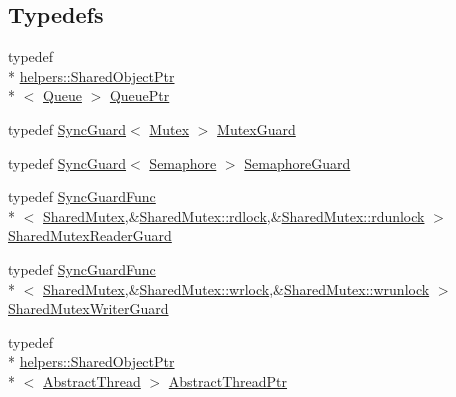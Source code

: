 \subsection*{Typedefs}
\begin{DoxyCompactItemize}
\item 
typedef \\*
\hyperlink{classlog4cplus_1_1helpers_1_1SharedObjectPtr}{helpers\-::\-Shared\-Object\-Ptr}\\*
$<$ \hyperlink{classlog4cplus_1_1thread_1_1Queue}{Queue} $>$ \hyperlink{namespacelog4cplus_1_1thread_a068fb33b4473fbc7d642ce6ea5a54b7d}{Queue\-Ptr}
\item 
typedef \hyperlink{classlog4cplus_1_1thread_1_1SyncGuard}{Sync\-Guard}$<$ \hyperlink{classlog4cplus_1_1thread_1_1Mutex}{Mutex} $>$ \hyperlink{namespacelog4cplus_1_1thread_a8ce7cde94c7a54f5b9e592eb1d4229c2}{Mutex\-Guard}
\item 
typedef \hyperlink{classlog4cplus_1_1thread_1_1SyncGuard}{Sync\-Guard}$<$ \hyperlink{classlog4cplus_1_1thread_1_1Semaphore}{Semaphore} $>$ \hyperlink{namespacelog4cplus_1_1thread_af6c3058cbd378ff5317290189cb822f3}{Semaphore\-Guard}
\item 
typedef \hyperlink{classlog4cplus_1_1thread_1_1SyncGuardFunc}{Sync\-Guard\-Func}\\*
$<$ \hyperlink{classlog4cplus_1_1thread_1_1SharedMutex}{Shared\-Mutex},\&\hyperlink{classlog4cplus_1_1thread_1_1SharedMutex_acd11f6dbc4d91679655bce921922de85}{Shared\-Mutex\-::rdlock},\&\hyperlink{classlog4cplus_1_1thread_1_1SharedMutex_a82b134de3a73165f448fcb8b4ffb464d}{Shared\-Mutex\-::rdunlock} $>$ \hyperlink{namespacelog4cplus_1_1thread_a8bd093553b9a56ba1e032ebf07265da0}{Shared\-Mutex\-Reader\-Guard}
\item 
typedef \hyperlink{classlog4cplus_1_1thread_1_1SyncGuardFunc}{Sync\-Guard\-Func}\\*
$<$ \hyperlink{classlog4cplus_1_1thread_1_1SharedMutex}{Shared\-Mutex},\&\hyperlink{classlog4cplus_1_1thread_1_1SharedMutex_a02ee0f845373d648e8b329b557291f92}{Shared\-Mutex\-::wrlock},\&\hyperlink{classlog4cplus_1_1thread_1_1SharedMutex_ac0355fe97fdd3dfd89d5716f3326fce7}{Shared\-Mutex\-::wrunlock} $>$ \hyperlink{namespacelog4cplus_1_1thread_adf498119742efc3efc3df947998f36d5}{Shared\-Mutex\-Writer\-Guard}
\item 
typedef \\*
\hyperlink{classlog4cplus_1_1helpers_1_1SharedObjectPtr}{helpers\-::\-Shared\-Object\-Ptr}\\*
$<$ \hyperlink{classlog4cplus_1_1thread_1_1AbstractThread}{Abstract\-Thread} $>$ \hyperlink{namespacelog4cplus_1_1thread_a06509aec895c736c1e3b0736dc8183fb}{Abstract\-Thread\-Ptr}
\end{DoxyCompactItemize}
